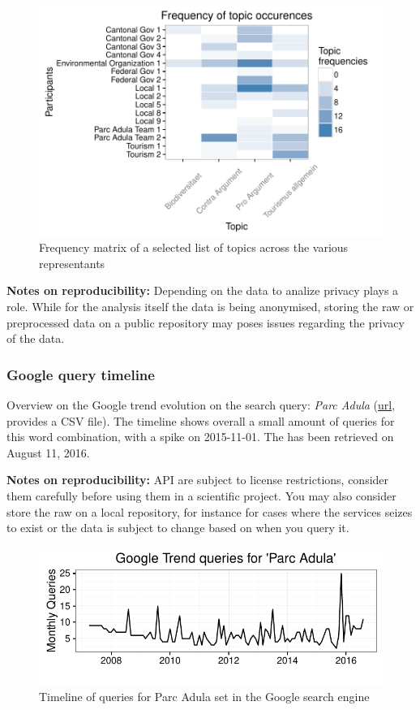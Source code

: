 \documentclass[]{article}
\begin{document}
\begin{figure}[htbp]
\centering
\includegraphics{publication_files/figure-latex/plotfreq-1.pdf}
\caption{Frequency matrix of a selected list of topics across the
various representants}
\end{figure}

\textbf{Notes on reproducibility:} Depending on the data to analize
privacy plays a role. While for the analysis itself the data is being
anonymised, storing the raw or preprocessed data on a public repository
may poses issues regarding the privacy of the data.

\subsubsection{Google query timeline}\label{google-query-timeline}

Overview on the Google trend evolution on the search query: \emph{Parc
Adula}
(\href{https://www.google.com/trends/explore?date=all\&q=parc\%20adula}{url},
provides a CSV file). The timeline shows overall a small amount of
queries for this word combination, with a spike on 2015-11-01. The has
been retrieved on August 11, 2016.

\textbf{Notes on reproducibility:} API are subject to license
restrictions, consider them carefully before using them in a scientific
project. You may also consider store the raw on a local repository, for
instance for cases where the services seizes to exist or the data is
subject to change based on when you query it.

\begin{figure}[htbp]
\centering
\includegraphics{publication_files/figure-latex/googleTrend-1.pdf}
\caption{Timeline of queries for Parc Adula set in the Google search
engine}
\end{figure}
\end{document}
